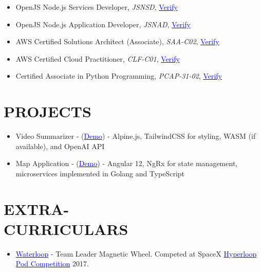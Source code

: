\documentclass[margin]{res}
\begin{document}
\begin{resume}
\begin{itemize}
		\item OpenJS Node.js Services Developer, \textit{JSNSD},
					\href{https://www.youracclaim.com/badges/d17570bd-2145-4cc2-9645-673fc3f6947e}{\textcolor{blue}{Verify}}

		\item OpenJS Node.js Application Developer, \textit{JSNAD},
		      \href{https://www.youracclaim.com/badges/76bcd62c-af5b-4957-b9ef-533403369d8d}{\textcolor{blue}{Verify}}

		\item AWS Certified Solutions Architect (Associate), \textit{SAA-C02},
		      \href{https://www.youracclaim.com/badges/4b572dd0-85e9-45f5-90f8-90a68cd3399f}{\textcolor{blue}{Verify}}

		\item AWS Certified Cloud Practitioner, \textit{CLF-C01},
		      \href{https://www.youracclaim.com/badges/48063b2f-6f7f-4b6c-a040-5c42393c4bc0}{\textcolor{blue}{Verify}}


		\item Certified Associate in Python Programming, \textit{PCAP-31-02},
		      \href{https://www.youracclaim.com/badges/bfd6aae6-1ab4-461b-8a62-f25cfb0bd29d}{\textcolor{blue}{Verify}}

	\end{itemize}

	\section{\textcolor{NavyBlue}{PROJECTS}}
	\begin{itemize}
 		\item Video Summarizer - (\href{https://video-summarizer.pages.dev/}{\textcolor{blue}{Demo}}) - Alpine.js, TailwindCSS
		 for styling, WASM (if available), and OpenAI API

		 \item 	Map Application - (\href{https://tripsultant.com}{\textcolor{blue}{Demo}}) - Angular 12, NgRx
		 for state management, microservices implemented in Golang and TypeScript
	\end{itemize}

	\section{\textcolor{NavyBlue}{EXTRA- \\ CURRICULARS}}
	\begin{itemize} \itemsep -2pt %
		\item \href{https://teamwaterloop.ca/}{\textcolor{blue}{Waterloop}} - Team Leader Magnetic Wheel. Competed at SpaceX \href{https://en.wikipedia.org/wiki/Hyperloop_pod_competition}{\textcolor{blue}{Hyperloop Pod Competition}} 2017.
	\end{itemize}


\end{resume}
\end{document}
